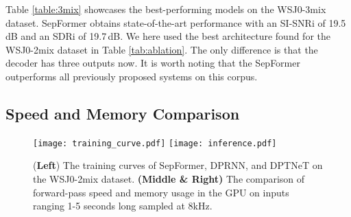 \documentclass[lettersize,journal]{IEEEtran}
\begin{document}
Table \ref{table:3mix} showcases the best-performing models on the WSJ0-3mix dataset. SepFormer obtains state-of-the-art performance with an SI-SNRi of 19.5\,dB and an SDRi of 19.7\,dB.
We here used the best architecture found for the WSJ0-2mix dataset in Table \ref{tab:ablation}. The only difference is that the decoder has three outputs now.
It is worth noting that the SepFormer outperforms all previously proposed systems on this corpus. 


 \begin{table}[t]
 \caption{Best results on the WSJ0-3mix dataset.}
 \vspace{0.1cm}
 \label{table:3mix}
 \centering
\end{table}

\subsection{Speed and Memory Comparison}
\label{sec:speed}

\begin{figure*}[t!]
    \centering
    \texttt{[image: training\_curve.pdf]}
    \texttt{[image: inference.pdf]}
    \vspace{-0.2cm}
    \caption{(\textbf{Left}) The training curves of SepFormer, DPRNN, and DPTNeT on the WSJ0-2mix dataset. \textbf{(Middle \& Right)} The comparison of forward-pass speed and memory usage in the GPU on inputs ranging 1-5 seconds long sampled at 8kHz.}
    \label{fig:forwardpass}
    \vspace{-0.2cm}
\end{figure*}
\end{document}
